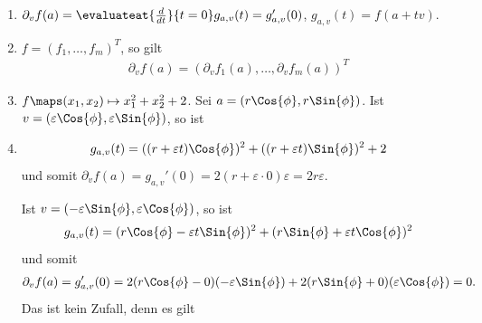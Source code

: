 \begin{bembspe}
    \begin{enumerate}
        \item \( \partial_v f(a)=\evaluateat{\frac{d}{dt}}{t=0} g_{a,v}(t)=g_{a,v}'(0) \), \( g_{a,v}(t)=f(a+tv) \).
        \item \( f=(f_1,\dotsc,f_m)^T \), so gilt
        \begin{align*}
            \partial_v f(a)=(\partial_v f_1(a),\dotsc, \partial_v f_m(a))^T
        \end{align*}
            \item \( f\maps (x_1,x_2)\mapsto x_1^2+x_2^2+2 \). Sei \( a=(r\Cos{\phi}, r\Sin{\phi}) \). Ist \( v=(\varepsilon \Cos{\phi}, \varepsilon\Sin{\phi}) \), so ist
            \item \begin{align*}
                g_{a,v}(t)=((r+\varepsilon t)\Cos{\phi})^2+((r+\varepsilon t)\Sin{\phi})^2+2
            \end{align*}
            und somit \( \partial_v f(a)=g_{a,v}'(0)=2(r+\varepsilon \cdot 0)\varepsilon=2r\varepsilon \).
            
            Ist \( v=(-\varepsilon \Sin{\phi}, \varepsilon \Cos{\phi}) \), so ist
            \begin{align*}
                g_{a,v}(t)=(r \Cos{\phi}-\varepsilon t\Sin{\phi})^2+(r\Sin{\phi}+\varepsilon t \Cos{\phi})^2
            \end{align*}
            und somit
            \begin{align*}
                \partial_v f(a)=g_{a,v}'(0)=2(r\Cos{\phi}-0)(-\varepsilon \Sin{\phi})+2(r\Sin{\phi}+0)(\varepsilon \Cos{\phi})=0.
            \end{align*}
            Das ist kein Zufall, denn es gilt
    \end{enumerate}
\end{bembspe}
